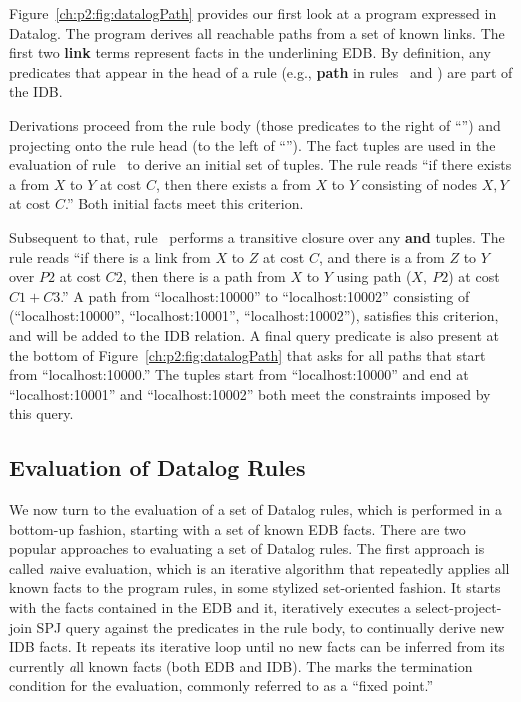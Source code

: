 Figure~\ref{ch:p2:fig:datalogPath} provides our first look at a program
expressed in Datalog.  The program derives all reachable paths from a set of
known links.  The first two {\bf link} terms represent facts in the underlining
EDB.  By definition, any predicates that appear in the head of a rule (e.g.,
{\bf path} in rules~ and ) are part of the IDB.

Derivations proceed from the rule body (those predicates to the right of
``\ol{:-}'') and projecting onto the rule head (to the left of ``\ol{:-}'').
The  fact tuples are used in the evaluation of rule~ to derive
an initial set of  tuples.  The rule reads ``if there exists a
 from $X$ to $Y$ at cost $C$, then there exists a  from $X$
to $Y$ consisting of nodes $X, Y$ at cost $C$.'' Both initial facts meet this
criterion.

Subsequent to that, rule~ performs a transitive closure over any
 {\bf and}  tuples.  The rule reads ``if there is a link from
$X$ to $Z$ at cost $C$, and there is a  from $Z$ to $Y$ over $P2$ at
cost $C2$, then there is a path from $X$ to $Y$ using path ($X,\ P2$) at cost
$C1+C3$.'' A path from ``localhost:10000'' to ``localhost:10002'' consisting of
(``localhost:10000'', ``localhost:10001'', ``localhost:10002''), satisfies this
criterion, and will be added to the IDB  relation.  A final query
predicate is also present at the bottom of Figure~\ref{ch:p2:fig:datalogPath}
that asks for all paths that start from ``localhost:10000.'' The 
tuples start from ``localhost:10000'' and end at ``localhost:10001'' and
``localhost:10002'' both meet the constraints imposed by this query.

\subsection{Evaluation of Datalog Rules}

We now turn to the evaluation of a set of Datalog rules, which is performed in
a bottom-up fashion, starting with a set of known EDB facts.  There are two
popular approaches to evaluating a set of Datalog rules.  The first approach is
called {\emph naive evaluation}, which is an iterative algorithm that repeatedly
applies all known facts to the program rules, in some stylized set-oriented
fashion.  It starts with the facts contained in the EDB and it, iteratively
executes a select-project-join SPJ query against the predicates in the rule
body, to continually derive new IDB facts.  It repeats its iterative loop until
no new facts can be inferred from its currently {\emph all} known facts (both
EDB and IDB).  The marks the termination condition for the evaluation, commonly
referred to as a ``fixed point.''

